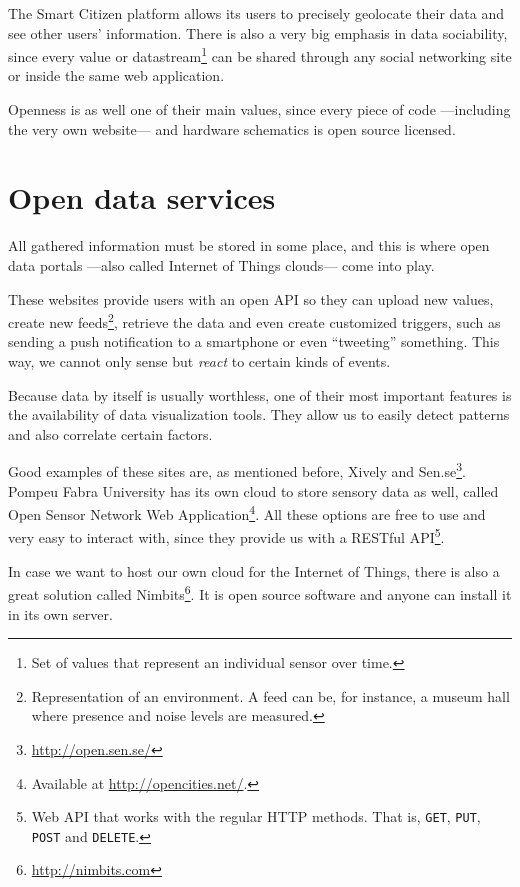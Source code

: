 The Smart Citizen platform allows its users to precisely geolocate their data and see other users' information. There is also a very big emphasis in data sociability, since every value or datastream\footnote{Set of values that represent an individual sensor over time.} can be shared through any social networking site or inside the same web application.

Openness is as well one of their main values, since every piece of code ---including the very own website--- and hardware schematics is open source licensed.


\section{Open data services}

All gathered information must be stored in some place, and this is where open data portals ---also called Internet of Things clouds--- come into play.

These websites provide users with an open API so they can upload new values, create new feeds\footnote{Representation of an environment. A feed can be, for instance, a museum hall where presence and noise levels are measured.}, retrieve the data and even create customized triggers, such as sending a push notification to a smartphone or even ``tweeting'' something. This way, we cannot only sense but \emph{react} to certain kinds of events.

Because data by itself is usually worthless, one of their most important features is the availability of data visualization tools. They allow us to easily detect patterns and also correlate certain factors.

Good examples of these sites are, as mentioned before, Xively and Sen.se\footnote{\url{http://open.sen.se/}}. Pompeu Fabra University has its own cloud to store sensory data as well, called Open Sensor Network Web Application\footnote{Available at \url{http://opencities.net/}.}. All these options are free to use and very easy to interact with, since they provide us with a RESTful API\footnote{Web API that works with the regular HTTP methods. That is, \texttt{GET}, \texttt{PUT}, \texttt{POST} and \texttt{DELETE}.}.

In case we want to host our own cloud for the Internet of Things, there is also a great solution called Nimbits\footnote{\url{http://nimbits.com}}. It is open source software and anyone can install it in its own server.
